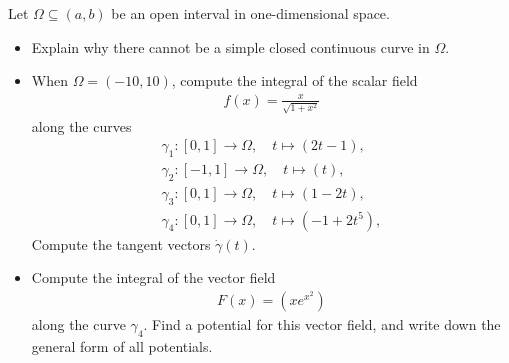 \documentclass[11pt]{article}
\begin{document}
\begin{exercise}
    Let $\Omega \subseteq (a,b)$ be an open interval in one-dimensional space.
    \begin{itemize}
     \item Explain why there cannot be a simple closed continuous curve in $\Omega$.
     \item When $\Omega = (-10,10)$, compute the integral of the scalar field 
     \begin{gather*}
        f(x) = \frac{x}{\sqrt{1+x^2}}
     \end{gather*}
     along the curves 
     \begin{gather*}
        \gamma_1 : [0,1] \rightarrow \Omega, \quad t \mapsto (2t - 1),
        \\
        \gamma_2 : [-1,1] \rightarrow \Omega, \quad t \mapsto (t),
        \\
        \gamma_3 : [0,1] \rightarrow \Omega, \quad t \mapsto (1-2t),
        \\
        \gamma_4 : [0,1] \rightarrow \Omega, \quad t \mapsto (-1 + 2t^5),
    \end{gather*}
    Compute the tangent vectors $\dot\gamma(t)$.
    \item 
    Compute the integral of the vector field 
    \begin{align}
        F(x) = \left( x e^{x^2} \right)
    \end{align}
    along the curve $\gamma_4$. Find a potential for this vector field, and write down the general form of all potentials.
    \end{itemize}
\end{exercise}
\end{document}
